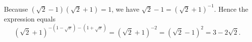 Because \((\sqrt2-1)(\sqrt2+1)=1\), we have \(\sqrt2-1=(\sqrt2+1)^{-1}\). Hence the expression equals
\[
(\sqrt2+1)^{-(1-\sqrt x)-(1+\sqrt x)}=(\sqrt2+1)^{-2}=(\sqrt2-1)^2=\boxed{3-2\sqrt2}.
\]
